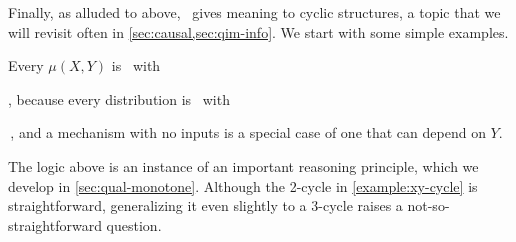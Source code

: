 Finally, as alluded to above, \scibility\ gives meaning to cyclic structures,
    a topic that we will revisit often in \cref{sec:causal,sec:qim-info}. 
We start with some simple examples. 
\begin{example}
        \label{example:xy-cycle}
    Every $\mu(X,Y)$ is \cible\ with
    ,
    because every distribution is \cible\ with
    \,,
    and a mechanism with no inputs is a special case of one that can depend on $Y$.
    \qedhere
\end{example}
The logic above is an instance of an important reasoning principle,
    which we develop in \cref{sec:qual-monotone}. 
Although the 2-cycle in \cref{example:xy-cycle} is straightforward, generalizing it even slightly to a 3-cycle raises a not-so-straightforward question.
     
